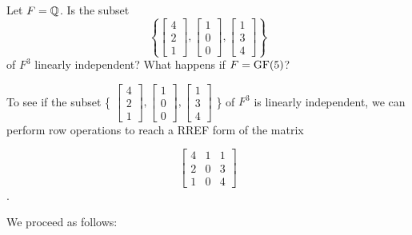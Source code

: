 \begin{ProbBox} %
\begin{problem}[Golan 163]
Let $F = \mathbb{Q}$.  Is the subset
\[
\left\{ 
\begin{bmatrix}
  4\\[0.3em] 2\\[0.3em] 1
\end{bmatrix},
\begin{bmatrix}
  1\\[0.3em] 0\\[0.3em] 0
\end{bmatrix},
\begin{bmatrix}
  1\\[0.3em] 3\\[0.3em] 4
\end{bmatrix}
\right\}
\]
of $F^3$ linearly independent?  What happens if $F = \operatorname{GF}(5)$?
\end{problem}
\smallskip
\begin{solution}
To see if the subset 
\{ 
$\begin{bmatrix}
  4\\[0.3em] 2\\[0.3em] 1
\end{bmatrix},
\begin{bmatrix}
  1\\[0.3em] 0\\[0.3em] 0
\end{bmatrix},
\begin{bmatrix}
  1\\[0.3em] 3\\[0.3em] 4
\end{bmatrix}$
\}
of $F^3$ is linearly independent, we can perform row operations to reach a RREF form of the matrix

\[ \left[ \begin{array}{ccc}
4 & 1 & 1 \\
2 & 0 & 3 \\
1 & 0 & 4 
\end{array} \right]
\].

We proceed as follows:


\end{solution}
\end{ProbBox}
